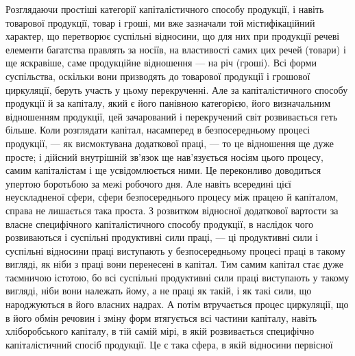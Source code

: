 Розглядаючи простіші категорії капіталістичного способу продукції, і навіть
товарової продукції, товар і гроші, ми вже зазначали той містифікаційний
характер, що перетворює суспільні відносини, що для них при продукції речеві
елементи багатства правлять за носіїв, на властивості самих цих речей (товари)
і ще яскравіше, саме продукційне відношення — на річ (гроші). Всі форми
суспільства, оскільки вони призводять до товарової продукції і грошової циркуляції,
беруть участь у цьому перекрученні. Але за капіталістичного способу
продукції й за капіталу, який є його панівною категорією, його визначальним
відношенням продукції, цей зачарований і перекручений світ розвивається геть
більше. Коли розглядати капітал, насамперед в безпосередньому процесі продукції,
— як висмоктувана додаткової праці, — то це відношення ще дуже просте;
і дійсний внутрішній зв’язок ще нав’язується носіям цього процесу, самим
капіталістам і ще усвідомлюється ними. Це переконливо доводиться упертою
боротьбою за межі робочого дня. Але навіть всередині цієї неускладненої сфери,
сфери безпосереднього процесу між працею й капіталом, справа не лишається
така проста. З розвитком відносної додаткової вартости за власне специфічного
капіталістичного способу продукції, в наслідок чого розвиваються і суспільні
продуктивні сили праці, — ці продуктивні сили і суспільні відносини праці виступають
у безпосередньому процесі праці в такому вигляді, як ніби з праці
вони перенесені в капітал. Тим самим капітал стає дуже таємничою істотою,
бо всі суспільні продуктивні сили праці виступають у такому вигляді,
ніби вони належать йому, а не праці як такій, і як такі сили, що народжуються
в його власних надрах. А потім втручається процес циркуляції, що
в його обмін речовин і зміну форм втягується всі частини капіталу, навіть
хліборобського капіталу, в тій самій мірі, в якій розвивається специфічно
капіталістичний спосіб продукції. Це є така сфера, в якій відносини первісної
\parbreak{}  %
